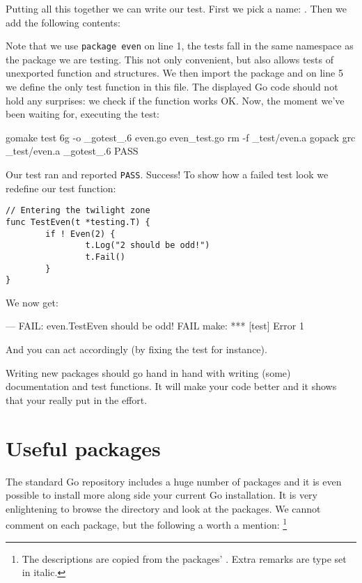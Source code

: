 Putting all this together we can write our test. First
we pick a name: . Then we add the following contents:

Note that we use \lstinline{package even} on line 1, the tests fall in the same
namespace as the package we are testing. This not only convenient, but
also allows tests of unexported function and structures. We then import
the  package and on line 5 we define the only test
function in this file. The displayed Go code should not hold any
surprises: we check if the  function works OK. 
Now, the moment we've been waiting for, executing the test:
\begin{display}
\pr gomake test
6g -o \_gotest\_.6 even.go  even\_test.go
rm -f \_test/even.a
gopack grc \_test/even.a \_gotest\_.6 
PASS
\end{display}
\noindent{}Our test ran and reported \texttt{PASS}. Success! To show how a failed
test look we redefine our test function:
\begin{lstlisting}
// Entering the twilight zone
func TestEven(t *testing.T) {
        if ! Even(2) {
                t.Log("2 should be odd!")
                t.Fail()
        }   
}
\end{lstlisting}
We now get:
\begin{display}
--- FAIL: even.TestEven
\qquad{} should be odd!
FAIL
make: *** [test] Error 1
\end{display}
\noindent{}And you can act accordingly (by fixing the test for instance).

\begin{lbar}
Writing new packages should go hand in hand with writing (some)
documentation and test functions. It will make your code better and it
shows that your really put in the effort.
\end{lbar}

\section{Useful packages}
The standard Go repository includes a huge number of packages and it is
even possible to install more along side your current Go installation. 
It is very enlightening to browse the  directory and
look at the packages.
We cannot comment on each package, but the following a worth a mention:
\footnote{The descriptions are copied from the packages' . Extra
remarks are type set in italic.}

